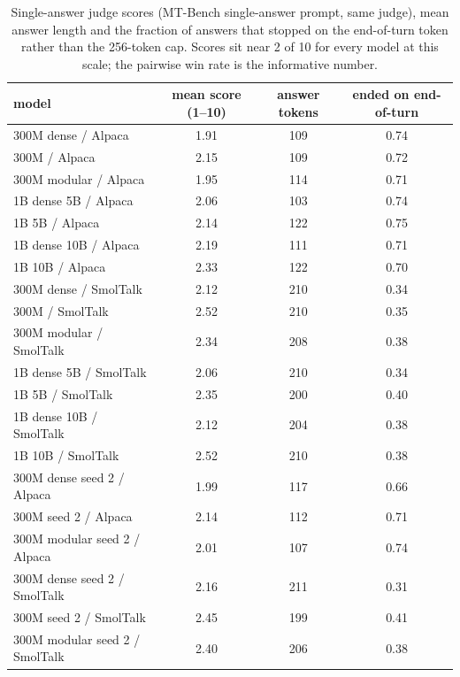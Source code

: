 \begin{table}[h]\centering\footnotesize\setlength{\tabcolsep}{3pt}
\begin{tabular}{lccc}\toprule
model & mean score (1--10) & answer tokens & ended on end-of-turn \\\midrule
300M dense / Alpaca & 1.91 & 109 & 0.74 \\
300M \dagf{} / Alpaca & 2.15 & 109 & 0.72 \\
300M modular / Alpaca & 1.95 & 114 & 0.71 \\
1B dense 5B / Alpaca & 2.06 & 103 & 0.74 \\
1B \dagf{} 5B / Alpaca & 2.14 & 122 & 0.75 \\
1B dense 10B / Alpaca & 2.19 & 111 & 0.71 \\
1B \dagf{} 10B / Alpaca & 2.33 & 122 & 0.70 \\
300M dense / SmolTalk & 2.12 & 210 & 0.34 \\
300M \dagf{} / SmolTalk & 2.52 & 210 & 0.35 \\
300M modular / SmolTalk & 2.34 & 208 & 0.38 \\
1B dense 5B / SmolTalk & 2.06 & 210 & 0.34 \\
1B \dagf{} 5B / SmolTalk & 2.35 & 200 & 0.40 \\
1B dense 10B / SmolTalk & 2.12 & 204 & 0.38 \\
1B \dagf{} 10B / SmolTalk & 2.52 & 210 & 0.38 \\
300M dense seed 2 / Alpaca & 1.99 & 117 & 0.66 \\
300M \dagf{} seed 2 / Alpaca & 2.14 & 112 & 0.71 \\
300M modular seed 2 / Alpaca & 2.01 & 107 & 0.74 \\
300M dense seed 2 / SmolTalk & 2.16 & 211 & 0.31 \\
300M \dagf{} seed 2 / SmolTalk & 2.45 & 199 & 0.41 \\
300M modular seed 2 / SmolTalk & 2.40 & 206 & 0.38 \\
\bottomrule\end{tabular}
\caption{Single-answer judge scores (MT-Bench single-answer prompt, same judge), mean answer length and the fraction of answers that stopped on the end-of-turn token rather than the 256-token cap. Scores sit near 2 of 10 for every model at this scale; the pairwise win rate is the informative number.}
\label{tab:chat_scores}\end{table}
